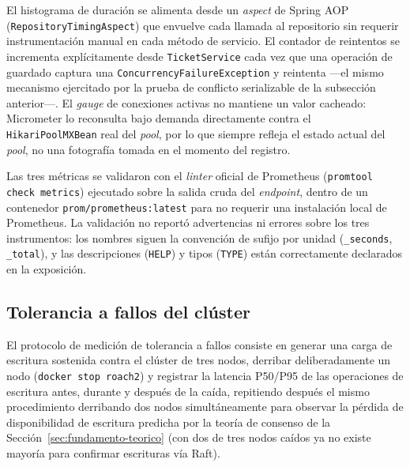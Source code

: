 \documentclass[11pt,letterpaper]{article}
\begin{document}
El histograma de duración se alimenta desde un \emph{aspect} de Spring AOP
(\texttt{RepositoryTimingAspect}) que envuelve cada llamada al repositorio sin requerir
instrumentación manual en cada método de servicio. El contador de reintentos se incrementa
explícitamente desde \texttt{TicketService} cada vez que una operación de guardado captura una
\texttt{ConcurrencyFailureException} y reintenta —el mismo mecanismo ejercitado por la prueba de
conflicto serializable de la subsección anterior—. El \emph{gauge} de conexiones activas no
mantiene un valor cacheado: Micrometer lo reconsulta bajo demanda directamente contra el
\texttt{HikariPoolMXBean} real del \emph{pool}, por lo que siempre refleja el estado actual del
\emph{pool}, no una fotografía tomada en el momento del registro.

Las tres métricas se validaron con el \emph{linter} oficial de Prometheus (\texttt{promtool check
metrics}) ejecutado sobre la salida cruda del \emph{endpoint}, dentro de un contenedor
\texttt{prom/prometheus:latest} para no requerir una instalación local de Prometheus. La
validación no reportó advertencias ni errores sobre los tres instrumentos: los nombres siguen la
convención de sufijo por unidad (\texttt{\_seconds}, \texttt{\_total}), y las descripciones
(\texttt{HELP}) y tipos (\texttt{TYPE}) están correctamente declarados en la exposición.

\subsection{Tolerancia a fallos del clúster}

El protocolo de medición de tolerancia a fallos consiste en generar una carga de escritura
sostenida contra el clúster de tres nodos, derribar deliberadamente un nodo
(\texttt{docker stop roach2}) y registrar la latencia P50/P95 de las operaciones de escritura
antes, durante y después de la caída, repitiendo después el mismo procedimiento derribando dos
nodos simultáneamente para observar la pérdida de disponibilidad de escritura predicha por la
teoría de consenso de la Sección~\ref{sec:fundamento-teorico} (con dos de tres nodos caídos ya no
existe mayoría para confirmar escrituras vía Raft).
\end{document}
